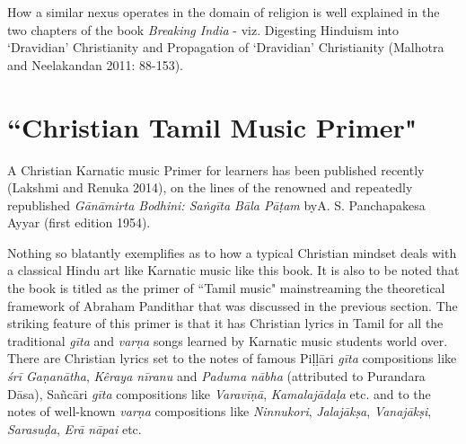 How a similar nexus operates in the domain of religion is well explained in the two chapters of the book \textit{Breaking India} - viz. Digesting Hinduism into `Dravidian' Christianity and Propagation of `Dravidian' Christianity (Malhotra and Neelakandan 2011: 88-153).


\vspace{-.3cm}

\section*{``Christian Tamil Music Primer"}

\vspace{-.2cm}

A Christian Karnatic music Primer for learners has been published recently (Lakshmi and Renuka 2014), on the lines of the renowned and repeatedly republished \textit{Gānāmirta Bodhini: Saṅgīta Bāla Pāṭ­am} by\break A. S. Panchapakesa Ayyar (first edition 1954).

Nothing so blatantly exemplifies as to how a typical Christian mindset deals with a classical Hindu art like Karnatic music like this book. It is also to be noted that the book is titled as the primer of ``Tamil music" mainstreaming the theoretical framework of Abraham Pandithar that was discussed in the previous section. The striking feature of this primer is that it has Christian lyrics in Tamil for all the traditional \textit{gīta} and \textit{varṇa} songs learned by Karnatic music students world over. There are Christian lyrics set to the notes of famous Piḷḷāri \textit{gīta} compositions like \textit{śrī Gaṇanātha}, \textit{Kêraya nīranu} and \textit{Paduma nābha }(attributed to Purandara Dāsa), Sañcāri \textit{gīta} compositions like \textit{Varavīṇā}, \textit{Kamalajādaḷa} etc. and to the notes of well-known \textit{varṇa} compositions like \textit{Ninnukori}, \textit{Jalajākṣa}, \textit{Vanajākṣi}, \textit{Sarasuḍa}, \textit{Erā nāpai} etc.

